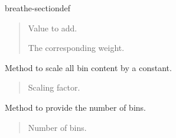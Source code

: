 \documentclass[letterpaper,10pt,english]{sphinxmanual}
\begin{document}
\begin{fulllineitems}
\begin{sphinxuseclass}{breathe-sectiondef}
\begin{fulllineitems}
\sphinxAtStartPar
\begin{quote}\begin{description}
\sphinxAtStartPar
Value to add. 

\sphinxAtStartPar
The corresponding weight. 

\end{description}\end{quote}


\end{fulllineitems}


\begin{fulllineitems}
\label{\detokenize{Simulation/SimulationCodeDoc:_CPPv4N4Hist5ScaleEd}}
\pysigstartsignatures
\pysigstartmultiline
{}
\pysigstopmultiline
\pysigstopsignatures
\sphinxAtStartPar
Method to scale all bin content by a constant. 

\sphinxAtStartPar
\begin{quote}\begin{description}
\sphinxAtStartPar
Scaling factor. 

\end{description}\end{quote}


\end{fulllineitems}


\begin{fulllineitems}
\label{\detokenize{Simulation/SimulationCodeDoc:_CPPv4NK4Hist10GetNumBinsEv}}
\pysigstartsignatures
\pysigstartmultiline
{}
\pysigstopmultiline
\pysigstopsignatures
\sphinxAtStartPar
Method to provide the number of bins. 

\sphinxAtStartPar
\begin{quote}\begin{description}
\sphinxAtStartPar
Number of bins. 

\end{description}\end{quote}


\end{fulllineitems}


\end{sphinxuseclass}
\end{fulllineitems}
\end{document}
